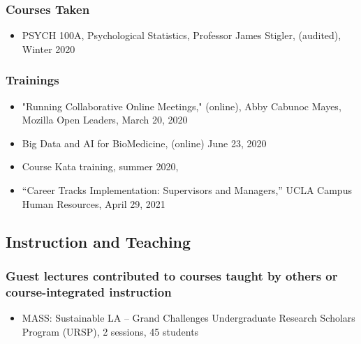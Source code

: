 \subsubsection{Courses Taken}
\begin{itemize}[label={},leftmargin=!,labelindent=5pt,itemindent=-15pt]
  \item PSYCH 100A, Psychological Statistics, Professor James Stigler, (audited), Winter 2020
  
\end{itemize}


\subsubsection{Trainings}

\begin{itemize}[label=
{},leftmargin=!,labelindent=5pt,itemindent=-15pt]
  \item "Running Collaborative Online Meetings," (online), Abby Cabunoc Mayes, Mozilla Open Leaders, March 20, 2020 
  \item Big Data and AI for BioMedicine, (online) June 23, 2020 
  \item Course Kata training, summer 2020, 
\item “Career Tracks Implementation: Supervisors and Managers,” UCLA Campus Human Resources, April 29, 2021


\end{itemize}



\subsection{Instruction and Teaching}

\subsubsection{Guest lectures contributed to courses taught by others or course-integrated instruction}

\begin{itemize}[label={}, leftmargin=!,labelindent=5pt,itemindent=-15pt]
  \item MASS: Sustainable LA – Grand Challenges Undergraduate Research Scholars Program (URSP), 2 sessions, 45 students
  
\end{itemize}


